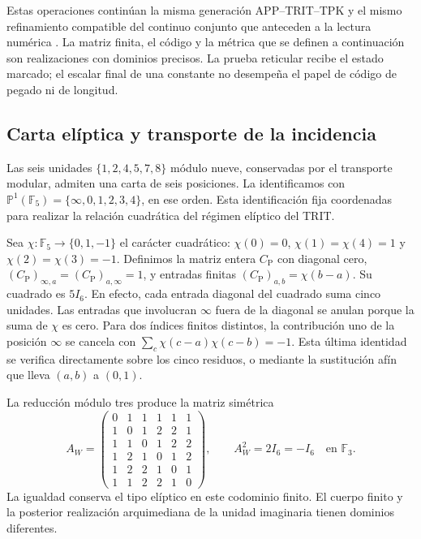 \documentclass[a4paper,10pt]{article}
\theoremstyle{definition}\newtheorem{definition}[theorem]{Definición}
\theoremstyle{remark}\newtheorem{remark}[theorem]{Observación}
\numberwithin{equation}{section}
\begin{document}
Estas operaciones continúan la misma generación
APP--TRIT--TPK y el mismo refinamiento compatible del continuo
conjunto que anteceden a la lectura numérica \cite{HMT-IV}.
La matriz finita, el código y la métrica que se definen a
continuación son realizaciones con dominios precisos. La prueba
reticular recibe el estado marcado; el escalar final de una
constante no desempeña el papel de código de pegado ni de longitud.

\subsection{Carta elíptica y transporte de la incidencia}
\label{subsec:lf-incidence}

Las seis unidades \(\{1,2,4,5,7,8\}\) módulo nueve, conservadas
por el transporte modular, admiten una carta de seis posiciones.
La identificamos con
\(\mathbb P^1(\mathbb F_5)=\{\infty,0,1,2,3,4\}\), en ese orden.
Esta identificación fija coordenadas para realizar la relación
cuadrática del régimen elíptico del TRIT.

Sea \(\chi:\mathbb F_5\to\{0,1,-1\}\) el carácter cuadrático:
\(\chi(0)=0\), \(\chi(1)=\chi(4)=1\) y
\(\chi(2)=\chi(3)=-1\). Definimos la matriz entera
\(C_{\mathrm P}\) con diagonal cero,
\((C_{\mathrm P})_{\infty,a}=(C_{\mathrm P})_{a,\infty}=1\),
y entradas finitas \((C_{\mathrm P})_{a,b}=\chi(b-a)\).
Su cuadrado es \(5I_6\). En efecto, cada entrada diagonal del
cuadrado suma cinco unidades. Las entradas que involucran
\(\infty\) fuera de la diagonal se anulan porque la suma de
\(\chi\) es cero. Para dos índices finitos distintos, la
contribución uno de la posición \(\infty\) se cancela con
\(\sum_c\chi(c-a)\chi(c-b)=-1\). Esta última identidad se verifica
directamente sobre los cinco residuos, o mediante la sustitución
afín que lleva \((a,b)\) a \((0,1)\).

La reducción módulo tres produce la matriz simétrica
\begin{equation}
 A_W=
 \begin{pmatrix}
 0&1&1&1&1&1\\
 1&0&1&2&2&1\\
 1&1&0&1&2&2\\
 1&2&1&0&1&2\\
 1&2&2&1&0&1\\
 1&1&2&2&1&0
 \end{pmatrix},
 \qquad A_W^2=2I_6=-I_6
 \quad\text{en }\mathbb F_3.
 \label{eq:lf-aw}
\end{equation}
La igualdad conserva el tipo elíptico en este codominio finito.
El cuerpo finito y la posterior realización arquimediana de la
unidad imaginaria tienen dominios diferentes.
\end{document}
